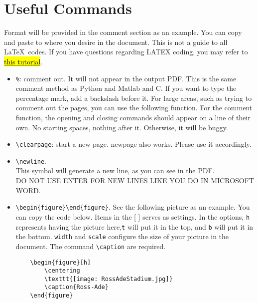 \documentclass[letterpaper, 11pt]{article}
\begin{document}
\clearpage
\section*{Useful Commands}
Format will be provided in the comment section as an example. You can copy and paste to where you desire in the document. This is not a guide to all \LaTeX\ codes. If you have questions regarding LATEX coding, you may refer to \href{https://www.overleaf.com/learn/latex/Learn_LaTeX_in_30_minutes}{\hl{this tutorial}}.
\begin{itemize}
    \item \verb|%|: comment out. It will not appear in the output PDF. This is the same comment method as Python and Matlab and C. If you want to type the percentage mark, add a backslash before it. For large areas, such as trying to comment out the pages, you can use the following function. For the comment function, the opening and closing commands should appear on a line of their own. No starting spaces, nothing after it. Otherwise, it will be buggy. 
\begin{comment}
    All stuff here will be commented. 
\end{comment}
    \item \verb|\clearpage|: start a new page. newpage also works. Please use it accordingly. 
    \item \verb|\newline|. \\ 
    This symbol will generate a new line, as you can see in the PDF. \\
    DO NOT USE ENTER FOR NEW LINES LIKE YOU DO IN MICROSOFT WORD.
    \item \verb|\begin{figure}\end{figure}|. See the following picture as an example. You can copy the code below. Items in the [ ] serves as settings. In the options, \verb|h| represents having the picture here,\verb|t| will put it in the top, and \verb|b| will put it in the bottom. \verb|width| and \verb|scale| configure the size of your picture in the document. The command \verb|\caption| are required.
    \begin{verbatim}
    \begin{figure}[h]
        \centering
        \texttt{[image: RossAdeStadium.jpg]} 
        \caption{Ross-Ade}
    \end{figure}
    \end{verbatim}
    

\end{itemize}
\end{document}
